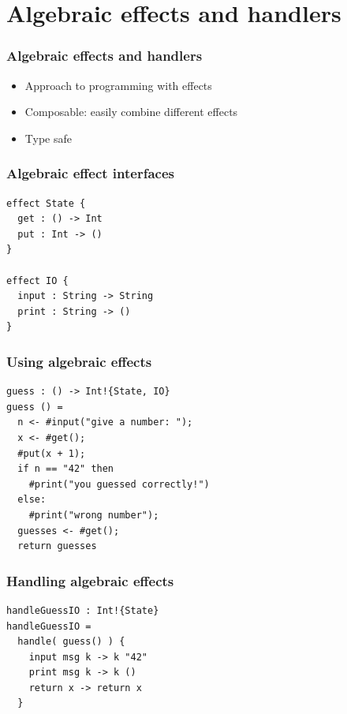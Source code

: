 \documentclass{beamer}
\begin{document}
\section{Algebraic effects and handlers}

\begin{frame}[fragile]\frametitle{Algebraic effects and handlers}
\begin{itemize}
\item Approach to programming with effects
\item Composable: easily combine different effects
\item Type safe
\end{itemize}
\end{frame}

\begin{frame}[fragile]\frametitle{Algebraic effect interfaces}
	\begin{example}
		\begin{verbatim}
effect State {
  get : () -> Int
  put : Int -> ()
}

effect IO {
  input : String -> String
  print : String -> ()
}
		\end{verbatim}
	\end{example}
\end{frame}

\begin{frame}[fragile]\frametitle{Using algebraic effects}
	\begin{example}
		\begin{verbatim}
guess : () -> Int!{State, IO}
guess () =
  n <- #input("give a number: ");
  x <- #get();
  #put(x + 1);
  if n == "42" then
    #print("you guessed correctly!")
  else:
    #print("wrong number");
  guesses <- #get();
  return guesses
		\end{verbatim}
	\end{example}
\end{frame}

\begin{frame}[fragile]\frametitle{Handling algebraic effects}
	\begin{example}
		\begin{verbatim}
handleGuessIO : Int!{State}
handleGuessIO =
  handle( guess() ) {
    input msg k -> k "42"
    print msg k -> k ()
    return x -> return x
  }
		\end{verbatim}
	\end{example}
\end{frame}
\end{document}
